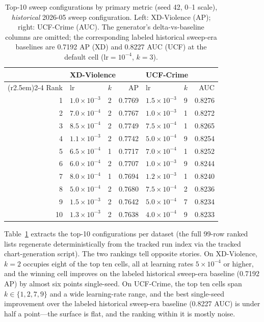 \begin{table}[t]
\centering
\caption{Top-10 sweep configurations by primary metric (seed 42, 0--1
scale), \emph{historical} 2026-05 sweep configuration. Left: XD-Violence
(AP); right: UCF-Crime (AUC). The generator's delta-vs-baseline columns are
omitted; the corresponding labeled historical sweep-era baselines are
0.7192 AP (XD) and 0.8227 AUC (UCF) at the default cell
($\mathrm{lr}=10^{-4}$, $k=3$).}
\label{tab:appc-ranked}
\begin{tabular}{rllr@{\hspace{2.5em}}llr}
\toprule
 & \multicolumn{3}{l}{XD-Violence} & \multicolumn{3}{l}{UCF-Crime} \\
\cmidrule(r{2.5em}){2-4} \cmidrule{5-7}
Rank & lr & $k$ & AP & lr & $k$ & AUC \\
\midrule
1  & $1.0\times10^{-3}$ & 2 & 0.7769 & $1.5\times10^{-3}$ & 9 & 0.8276 \\
2  & $7.0\times10^{-4}$ & 2 & 0.7767 & $1.0\times10^{-3}$ & 1 & 0.8272 \\
3  & $8.5\times10^{-4}$ & 2 & 0.7749 & $7.5\times10^{-4}$ & 1 & 0.8265 \\
4  & $1.1\times10^{-3}$ & 2 & 0.7742 & $5.0\times10^{-4}$ & 9 & 0.8254 \\
5  & $6.5\times10^{-4}$ & 1 & 0.7717 & $7.0\times10^{-4}$ & 1 & 0.8252 \\
6  & $6.0\times10^{-4}$ & 2 & 0.7707 & $1.0\times10^{-3}$ & 9 & 0.8244 \\
7  & $8.0\times10^{-4}$ & 1 & 0.7694 & $1.2\times10^{-3}$ & 1 & 0.8240 \\
8  & $5.0\times10^{-4}$ & 2 & 0.7680 & $7.5\times10^{-4}$ & 2 & 0.8236 \\
9  & $1.5\times10^{-3}$ & 2 & 0.7642 & $5.0\times10^{-4}$ & 7 & 0.8234 \\
10 & $1.3\times10^{-3}$ & 2 & 0.7638 & $4.0\times10^{-4}$ & 9 & 0.8233 \\
\bottomrule
\end{tabular}
\end{table}

Table~\ref{tab:appc-ranked} extracts the top-10 configurations per dataset
(the full 99-row ranked lists regenerate deterministically from the tracked
run index via the tracked chart-generation script). The two rankings tell
opposite stories. On XD-Violence, $k=2$ occupies eight of the top ten
cells, all at learning rates $5\times10^{-4}$ or higher, and the winning
cell improves on the labeled historical sweep-era baseline (0.7192 AP) by
almost six points single-seed. On UCF-Crime, the top ten cells span
$k \in \{1, 2, 7, 9\}$ and a wide learning-rate range, and the best
single-seed improvement over the labeled historical sweep-era baseline
(0.8227 AUC) is under half a point---the surface is flat, and the ranking
within it is mostly noise.

